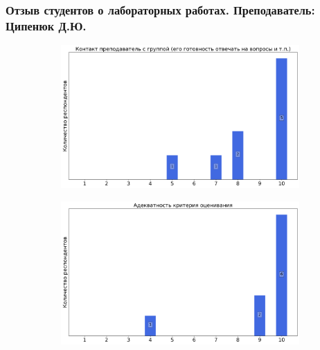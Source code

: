    \subsubsection{Отзыв студентов о лабораторных работах. Преподаватель: Ципенюк Д.Ю.}
        \begin{figure}[H]
            \centering
            \begin{subfigure}[b]{0.45\textwidth}
                \centering
                \includegraphics[width=\textwidth]{images/1 course/Общая физика - механика/labniks-marks-Ципенюк Д.Ю.-0.png}
            \end{subfigure}
            \begin{subfigure}[b]{0.45\textwidth}
                \centering
                \includegraphics[width=\textwidth]{images/1 course/Общая физика - механика/labniks-marks-Ципенюк Д.Ю.-1.png}
            \end{subfigure}
            \begin{subfigure}[b]{0.45\textwidth}
                \centering

\end{subfigure}
\end{figure}
